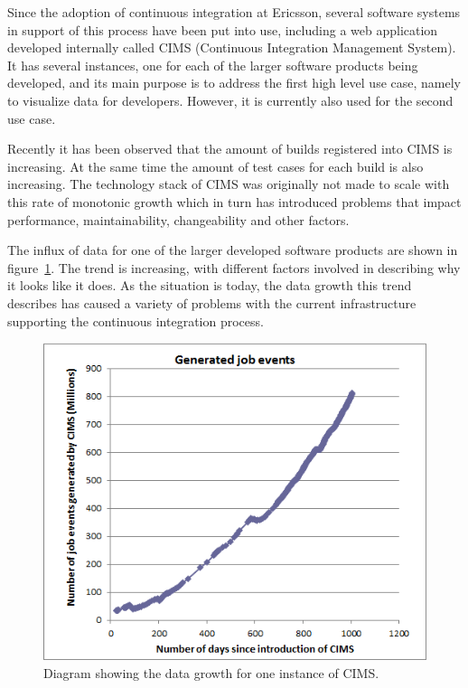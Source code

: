 Since the adoption of continuous integration at Ericsson, several software systems in support of this process have been put into use, including a web application developed internally called CIMS (Continuous Integration Management System). It has several instances, one for each of the larger software products being developed, and its main purpose is to address the first high level use case, namely to visualize data for developers. However, it is currently also used for the second use case.

Recently it has been observed that the amount of builds registered into CIMS is increasing. At the same time the amount of test cases for each build is also increasing. The technology stack of CIMS was originally not made to scale with this rate of monotonic growth which in turn has introduced problems that impact performance, maintainability, changeability and other factors.

The influx of data for one of the larger developed software products are shown in figure~\ref{fig:jeTrend}. The trend is increasing, with different factors involved in describing why it looks like it does. As the situation is today, the data growth this trend describes has caused a variety of problems with the current infrastructure supporting the continuous integration process.

\begin{figure}[h!]
\centering
\includegraphics[scale=0.65]{figure/jeTrend.png}
\caption{Diagram showing the data growth for one instance of CIMS.}
\label{fig:jeTrend}
\end{figure}

